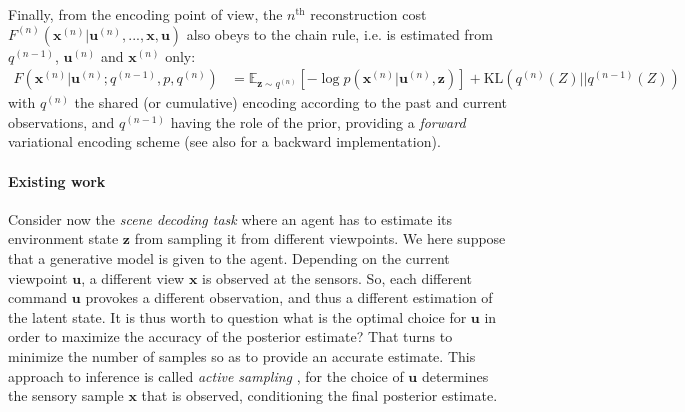 \documentclass{article}
\begin{document}
Finally, from the encoding point of view, the $n^\text{th}$ reconstruction cost $F^{(n)}(\boldsymbol{x}^{(n)}|\boldsymbol{u}^{(n)}, ..., \boldsymbol{x}, \boldsymbol{u})$ also obeys to the chain rule, i.e. is estimated from $q^{(n-1)}$, $\boldsymbol{u}^{(n)}$ and $\boldsymbol{x}^{(n)}$ only:
\begin{align}
F(\boldsymbol{x}^{(n)}|\boldsymbol{u}^{(n)}; q^{(n-1)}, p, q^{(n)}) 
&= \mathbb{E}_{\boldsymbol{z} \sim q^{(n)}} \left[-\log p(\boldsymbol{x}^{(n)}| \boldsymbol{u}^{(n)}, \boldsymbol{z})\right] + \text{KL}(q^{(n)}(Z)||q^{(n-1)}(Z))
\label{eq:FEP-uxun}
\end{align}
with $q^{(n)}$ the shared (or cumulative) encoding according to the past and current observations, and $q^{(n-1)}$ having the role of the prior, providing a \emph{forward} variational encoding scheme (see also \cite{fraccaro2016sequential} for a backward implementation). 


\paragraph{Existing work}

Consider now the \emph{scene decoding task} where an agent has to estimate its environment state $\boldsymbol{z}$ from sampling it from different viewpoints. We here suppose that a generative model  is given to the agent. 
Depending on  the current viewpoint $\boldsymbol{u}$, a different view $\boldsymbol{x}$ is observed at the sensors. So, each different command $\boldsymbol{u}$ provokes a different observation, and thus a different 
estimation of the latent state. It is thus worth to question what is the optimal choice for $\boldsymbol{u}$ in order to maximize the accuracy of the posterior estimate?
That turns  to minimize the number of samples so as to provide an accurate estimate. This approach to inference is called \emph{active sampling} \cite{friston2012perceptions}, for the choice of $\boldsymbol{u}$ determines the sensory sample $\boldsymbol{x}$ that is observed, conditioning the final posterior estimate.
\end{document}
